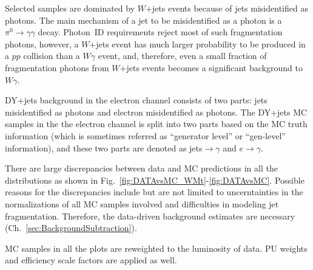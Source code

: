 Selected samples are dominated by $W$+jets events because of jets misidentified as photons. The main mechanism of a jet to be misidentified as a photon is a $\pi^0 \rightarrow \gamma\gamma$ decay. Photon~ID requirements reject most of such fragmentation photons, however, a $W$+jets event has much larger probability to be produced in a $pp$ collision than a $W\gamma$ event, and, therefore, even a small fraction of fragmentation photons from $W$+jets events becomes a significant background to $W\gamma$.  

DY+jets background in the electron channel consists of two parts: jets misidentified as photons and electron misidentified as photons. The DY+jets MC samples in the the electron channel is split into two parts based on the MC truth information (which is sometimes referred as ``generator level'' or ``gen-level'' information), and these two parts are denoted as jets$\rightarrow\gamma$ and $e\rightarrow\gamma$.

There are large discrepancies between data and MC predictions in all the distributions as shown in Fig.~\ref{fig:DATAvsMC_WMt}-\ref{fig:DATAvsMC}. Possible reasons for the discrepancies include but are not limited to uncerntainties in the normalizations of all MC samples involved and difficulties in modeling jet fragmentation. Therefore, the data-driven background estimates are necessary (Ch.~\ref{sec:BackgroundSubtraction}).

MC samples in all the plots are reweighted to the luminosity of data. PU weights and efficiency scale factors are applied as well.

